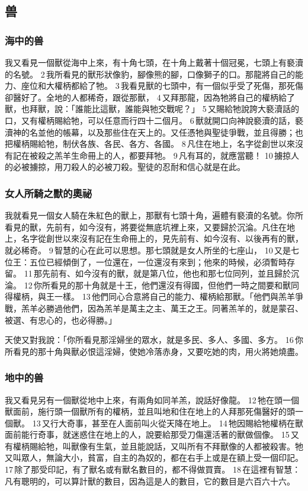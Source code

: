 \subsection{兽}
\subsubsection{海中的兽}

我又看見一個獸從海中上來，有十角七頭，在十角上戴著十個冠冕，七頭上有褻瀆的名號。 2 我所看見的獸形狀像豹，腳像熊的腳，口像獅子的口。那龍將自己的能力、座位和大權柄都給了牠。 3 我看見獸的七頭中，有一個似乎受了死傷，那死傷卻醫好了。全地的人都稀奇，跟從那獸， 4 又拜那龍，因為牠將自己的權柄給了獸，也拜獸，說：「誰能比這獸，誰能與牠交戰呢？」 5 又賜給牠說誇大褻瀆話的口，又有權柄賜給牠，可以任意而行四十二個月。 6 獸就開口向神說褻瀆的話，褻瀆神的名並他的帳幕，以及那些住在天上的。又任憑牠與聖徒爭戰，並且得勝；也把權柄賜給牠，制伏各族、各民、各方、各國。 8 凡住在地上，名字從創世以來沒有記在被殺之羔羊生命冊上的人，都要拜牠。 9 凡有耳的，就應當聽！ 10 擄掠人的必被擄掠，用刀殺人的必被刀殺。聖徒的忍耐和信心就是在此。

\subsubsection{女人所騎之獸的奧祕}
我就看見一個女人騎在朱紅色的獸上，那獸有七頭十角，遍體有褻瀆的名號。你所看見的獸，先前有，如今沒有，將要從無底坑裡上來，又要歸於沉淪。凡住在地上，名字從創世以來沒有記在生命冊上的，見先前有、如今沒有、以後再有的獸，就必稀奇。 9 智慧的心在此可以思想。那七頭就是女人所坐的七座山， 10 又是七位王：五位已經傾倒了，一位還在，一位還沒有來到；他來的時候，必須暫時存留。 11 那先前有、如今沒有的獸，就是第八位，他也和那七位同列，並且歸於沉淪。 12 你所看見的那十角就是十王，他們還沒有得國，但他們一時之間要和獸同得權柄，與王一樣。 13 他們同心合意將自己的能力、權柄給那獸。「他們與羔羊爭戰，羔羊必勝過他們，因為羔羊是萬主之主、萬王之王。同著羔羊的，就是蒙召、被選、有忠心的，也必得勝。」

天使又對我說：「你所看見那淫婦坐的眾水，就是多民、多人、多國、多方。 16 你所看見的那十角與獸必恨這淫婦，使她冷落赤身，又要吃她的肉，用火將她燒盡。



\subsubsection{地中的兽}
我又看見另有一個獸從地中上來，有兩角如同羊羔，說話好像龍。 12 牠在頭一個獸面前，施行頭一個獸所有的權柄，並且叫地和住在地上的人拜那死傷醫好的頭一個獸。 13 又行大奇事，甚至在人面前叫火從天降在地上。 14 牠因賜給牠權柄在獸面前能行奇事，就迷惑住在地上的人，說要給那受刀傷還活著的獸做個像。 15 又有權柄賜給牠，叫獸像有生氣，並且能說話，又叫所有不拜獸像的人都被殺害。牠又叫眾人，無論大小，貧富，自主的為奴的，都在右手上或是在額上受一個印記。 17 除了那受印記，有了獸名或有獸名數目的，都不得做買賣。 18 在這裡有智慧：凡有聰明的，可以算計獸的數目，因為這是人的數目，它的數目是六百六十六。
